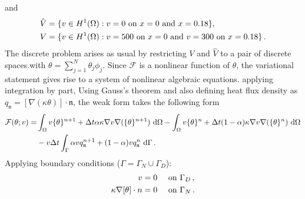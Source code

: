 \documentclass[]{article}
\begin{document}
and
\begin{equation}\label{eq10}
	\begin{aligned}
		\hat{V} &= \{v \in H^1(\Omega) : v = 0 \text{ on } x=0\mbox{ and }x=0.18\}, \\
		V &= \{v \in H^1(\Omega) : v = 500 \text{ on } x=0\text{ and } v = 300\text{ on }x=0.18\}\thinspace.
	\end{aligned}
\end{equation}
The discrete problem arises as usual by restricting $V$ and $\hat{V}$ to a pair of discrete spaces.with $\theta = \sum_{j=1}^N \theta_j \phi_j$. Since $\mathcal{F}$ is a nonlinear function of $\theta$, the variational statement gives rise to a system of nonlinear algebraic equations. applying integration by part, Using Gauss’s theorem and also defining  heat flux density as $q_{\mathfrak{n}} =  [\nabla(\kappa\theta)]\cdot\mathfrak{n}$, the weak form takes the following form
\begin{equation}\label{eq11}
	\begin{aligned}
		\mathcal{F}(\theta; v) =& \int_{\Omega} v \{\theta\}^{n+1} + \Delta t \alpha\kappa\nabla v \nabla(\{ \theta\}^{n+1}) \ \mathrm{d} \Omega - \int_{\Omega} v\{\theta\}^{n} + \Delta t (1-\alpha) \kappa\nabla v \nabla(\{\theta\}^{n}) \ \mathrm{d} \Omega \\
		&- v \Delta t \int_{\Gamma}  \alpha v q^{n+1}_{\mathfrak{n}} + (1-\alpha)v q^{n}_{\mathfrak{n}} \ \mathrm{d} \Gamma\thinspace.
	\end{aligned}
\end{equation}
Applying boundary conditions ($\Gamma = \Gamma_N \cup \Gamma_D$):
\begin{equation}\label{eq12}
	\begin{aligned}
		v= 0 \quad &\text{ on } \Gamma_D\thinspace, \\
		\kappa\nabla [\theta] \cdot n = 0 \quad &\text{ on } \Gamma_N \thinspace.
	\end{aligned}
\end{equation}
\end{document}
